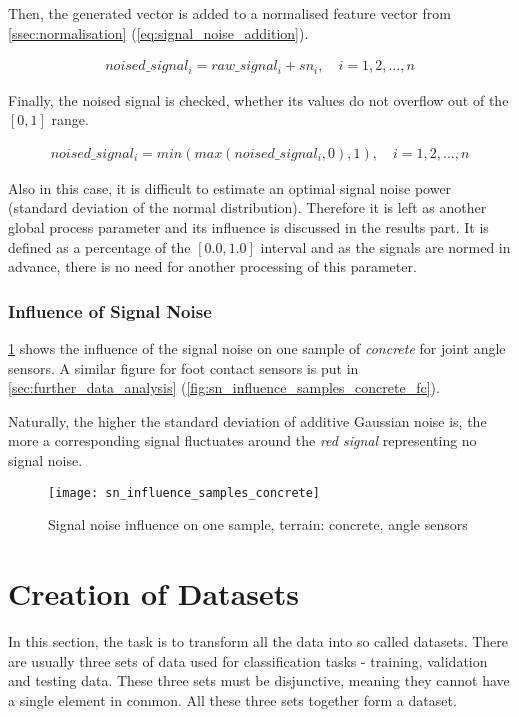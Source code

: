 Then, the generated vector is added to a normalised feature vector from \cref{ssec:normalisation} (\cref{eq:signal_noise_addition}).

\begin{align} \label{eq:signal_noise_addition}
noised\_signal_i = raw\_signal_i + sn_i, \quad i = 1, 2, ..., n
\end{align}

Finally, the noised signal is checked, whether its values do not overflow out of the $ [0, 1] $ range.

\begin{align}
noised\_signal_i = min(max(noised\_signal_i , 0), 1), \quad i = 1, 2, ..., n
\end{align}

Also in this case, it is difficult to estimate an optimal signal noise power (standard deviation of the normal distribution). Therefore it is left as another global process parameter and its influence is discussed in the results part. It is defined as a percentage of the $ [0.0, 1.0] $ interval and as the signals are normed in advance, there is no need for another processing of this parameter.

\subsubsection*{Influence of Signal Noise} \label{sssec:signal_noise_influence}
\cref{fig:sn_influence_samples_concrete} shows the influence of the signal noise on one sample of \textit{concrete} for joint angle sensors. A similar figure for foot contact sensors is put in \cref{sec:further_data_analysis} (\cref{fig:sn_influence_samples_concrete_fc}).

Naturally, the higher the standard deviation of additive Gaussian noise is, the more a corresponding signal fluctuates around the \textit{red signal} representing no signal noise.

\begin{figure}[H]
  \centering
  \texttt{[image: sn\_influence\_samples\_concrete]}
  \caption{Signal noise influence on one sample, terrain: concrete, angle sensors}
  \label{fig:sn_influence_samples_concrete}
\end{figure}

\section{Creation of Datasets} \label{sec:dataset_creation}
In this section, the task is to transform all the data into so called datasets. There are usually three sets of data used for classification tasks - training, validation and testing data. These three sets must be disjunctive, meaning they cannot have a single element in common. All these three sets together form a dataset.

